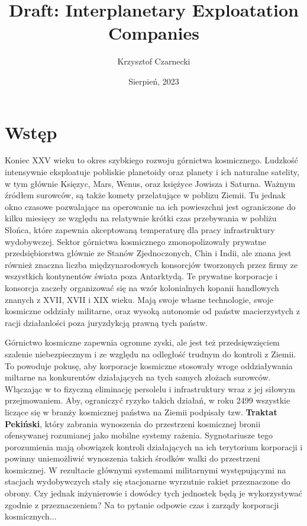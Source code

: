 \documentclass[11pt,a4paper]{article}
\begin{document}
\title{Draft: Interplanetary Exploatation Companies}
\author{Krzysztof Czarnecki}
\date{Sierpień, 2023}
\maketitle

\section{Wstęp}

Koniec XXV wieku to okres szybkiego rozwoju górnictwa kosmicznego. Ludzkość intensywnie eksploatuje pobliskie planetoidy oraz planety i ich naturalne satelity, w tym głównie Księzyc, Mars, Wenus, oraz księżyce Jowisza i Saturna. Ważnym źródłem surowców, są także komety przelatujące w poblizu Ziemii. Tu jednak okno czasowe pozwalające na operowanie na ich powieszchni jest ograniczone do kilku miesięcy ze względu na relatywnie krótki czas przebywania w pobliżu Słońca, które zapewnia akceptowaną temperaturę dla pracy infrastruktury wydobywczej. Sektor górnictwa kosmicznego zmonopolizowały prywatne przedsiębiorstwa głównie ze Stanów Zjednoczonych, Chin i Indii, ale znana jest również znaczna liczba międzynarodowych konsorcjów tworzonych przez firmy ze wszystkich kontynentów świata poza Antarktydą. Te prywatne korporacje i konsorcja zaczeły organizować się na wzór kolonialnych kopanii handlowych znanych z XVII, XVII i XIX wieku. Mają swoje własne technologie, swoje kosmiczne oddziały militarne, oraz wysoką autonomie od państw macierzystych z racji działanlości poza juryzdykcją prawną tych państw.  

Górnictwo kosmiczne zapewnia ogromne zyski, ale jest też przedsięwzięciem szalenie niebezpiecznym i ze względu na odległość trudnym do kontroli z Ziemii. To powoduje pokusę, aby korporacje kosmiczne stosowały wroge oddziaływania miltarne na konkurentów działających na tych samych złożach surowców. Włączając w to fizyczną eliminację persolelu i infrastruktury wraz z jej siłowym przejmowaniem. Aby, ograniczyć ryzyko takich działań, w roku 2499 wszystkie liczące się w branży kosmicznej państwa na Ziemii podpisały tzw. \textbf{Traktat Pekiński}, który zabrania wynoszenia do przestrzeni kosmicznej bronii ofensywanej rozumianej jako mobilne systemy rażenia. Sygnotariusze tego porozumienia mają obowiązek kontroli działających na ich terytorium korporacji i powinny uniemożliwić wynoszenia takich środków walki do przestrzeni kosmicznej. W rezultacie głównymi systemami militarnymi występującymi na stacjach wydobywczych stały się stacjonarne wyrzutnie rakiet przeznaczone do obrony. Czy jednak inżynierowie i dowódcy tych jednostek będą je wykorzystywać zgodnie z przeznaczeniem? Na to pytanie odpowie czas i zarządy korporacji kosmicznych...
\newpage
\end{document}
